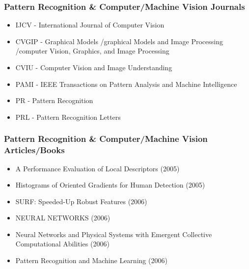 \documentclass[8pt]{beamer}
\begin{document}
\begin{frame}
\frametitle{Pattern Recognition \& Computer/Machine Vision Journals}
\begin{itemize}
\item IJCV - International Journal of Computer Vision
\item CVGIP - Graphical Models /graphical Models and Image Processing /computer Vision, Graphics, and Image Processing
\item CVIU - Computer Vision and Image Understanding
\item PAMI - IEEE Transactions on Pattern Analysis and Machine Intelligence
\item PR - Pattern Recognition
\item PRL - Pattern Recognition Letters
\end{itemize}
\end{frame}

\begin{frame}
\frametitle{Pattern Recognition \& Computer/Machine Vision Articles/Books}
\begin{itemize}
\item A Performance Evaluation of Local Descriptors (2005)
\item Histograms of Oriented Gradients for Human Detection (2005)
\item SURF: Speeded-Up Robust Features (2006)
\item NEURAL NETWORKS (2006)
\item Neural Networks and Physical Systems with Emergent Collective Computational Abilities (2006)
\item Pattern Recognition and Machine Learning (2006)
\end{itemize}
\end{frame}
\end{document}
